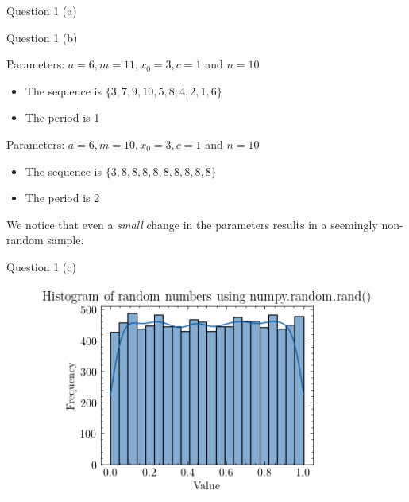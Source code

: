 \documentclass[compress,12pt]{beamer}
\begin{document}
\begin{frame}{Question 1 (a)}
\begin{frame}{Question 1 (b)}

      Parameters: $a = 6, m = 11, x_0 = 3, c = 1$ and $n=10$
      \begin{itemize}
            \item The sequence is $\{3, 7, 9, 10, 5, 8, 4, 2, 1, 6\}$
            \item The period is 1
      \end{itemize}

      Parameters: $a = 6, m = 10, x_0 = 3, c = 1$ and $n=10$
      \begin{itemize}
            \item The sequence is $\{3, 8, 8, 8, 8, 8, 8, 8, 8, 8\}$
            \item The period is 2
      \end{itemize}
    \begin{tcolorbox}
    We notice that even a \emph{small} change in the parameters results in a seemingly non-random sample.
      \end{tcolorbox}
\end{frame}

\begin{frame}{Question 1 (c)}
      \begin{figure}
            \centering
            \includegraphics[scale=0.7]{imgs/1d.png}
      \end{figure}
\end{frame}


\end{frame}
\end{document}
